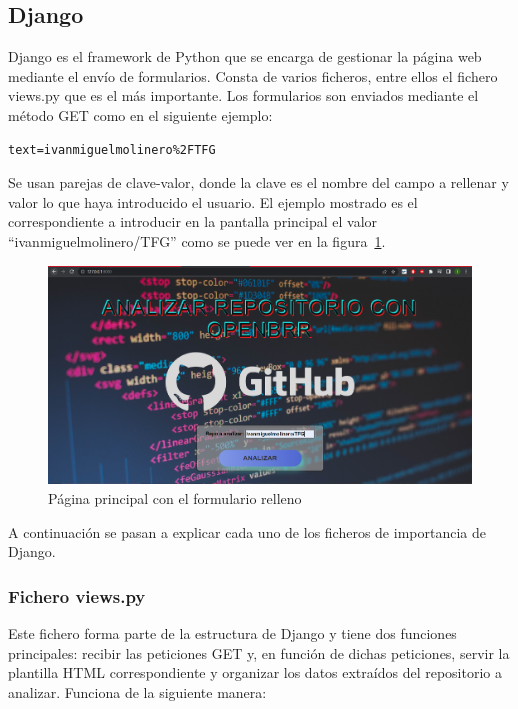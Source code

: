 \documentclass[a4paper, 12pt]{book}
\begin{document}
\subsection{Django}
Django es el framework de Python que se encarga de gestionar la página web mediante el envío de formularios. Consta de varios ficheros, entre ellos el fichero views.py que es el más importante.
Los formularios son enviados mediante el método GET como en el siguiente ejemplo:
\begin{verbatim}
text=ivanmiguelmolinero%2FTFG
\end{verbatim}
Se usan parejas de clave-valor, donde la clave es el nombre del campo a rellenar y valor lo que haya introducido el usuario. El ejemplo mostrado es el correspondiente a introducir en la pantalla principal el valor ``ivanmiguelmolinero/TFG'' como se puede ver en la figura~\ref{fig:ivanmiguelmolinero/TFG}.
\begin{figure}
    
    \includegraphics[bb=0 0 800 600, width=12cm, keepaspectratio]{img/maintfg.png}
    \caption{Página principal con el formulario relleno}\label{fig:ivanmiguelmolinero/TFG}
\end{figure}
A continuación se pasan a explicar cada uno de los ficheros de importancia de Django.

\subsubsection{Fichero views.py}
\label{sec:views.py}
Este fichero forma parte de la estructura de Django y tiene dos funciones principales: recibir las peticiones GET y, en función de dichas peticiones, servir la plantilla HTML correspondiente y organizar los datos extraídos del repositorio a analizar. Funciona de la siguiente manera:
\end{document}
